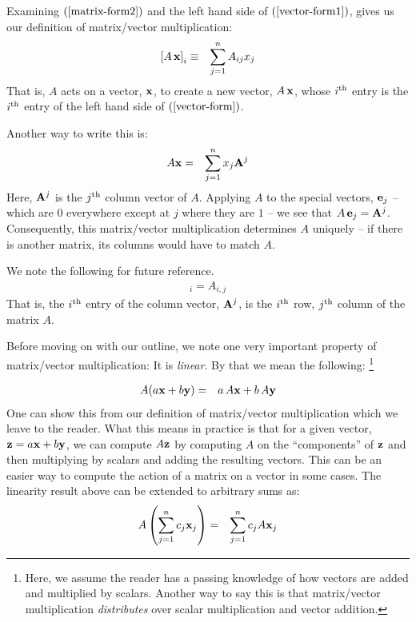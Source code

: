 \documentclass{article}
\begin{document}
Examining $(\ref{matrix-form2})$ and the left hand side of
$(\ref{vector-form1})$, gives us our definition of matrix/vector multiplication:
\begin{eqnarray}
  \left[A \, {\bf x}\right]_i & \equiv & \sum_{j=1}^n A_{ij} x_j
                                         \label{matrix-vector-mult}
\end{eqnarray}
That is, $A$ acts on a vector, ${\bf x}$, to create a new vector, $A \, {\bf x}$,
whose $i^{\rm th}$ entry is the $i^{\rm th}$ entry of
the left hand side of $(\ref{vector-form})$.

Another way to write this is:
\begin{eqnarray}
  A {\bf x} & = & \sum_{j=1}^n x_j {\bf A}^j
\end{eqnarray}
Here, ${\bf A}^j$ is the $j^{\rm th}$ column vector of $A$. Applying $A$ to the special
vectors, ${\bf e}_j$
-- which are $0$ everywhere except at $j$ where they are $1$ --
we see that $A \, {\bf e}_j = {\bf A}^j$. 
Consequently, this matrix/vector
multiplication determines $A$ uniquely
-- if there is another matrix, its columns would have to match $A$.

We note the following for future reference.
\begin{eqnarray}
	[{\bf A}^j]_i = A_{i, j} \label{vec-matrix-index}
\end{eqnarray}
That is, the $i^{\rm th}$ entry of the column vector, ${\bf A}^j$, is the
$i^{\rm th}$ row,  $j^{\rm th}$ column of the matrix $A$. 

Before moving on with our outline, we note one very important property of 
matrix/vector multiplication: It is {\em linear\/}.
By that we mean the following:%
\footnote{Here, we assume the reader has a passing knowledge of how vectors 
are added and multiplied by scalars. Another way to say this is that matrix/vector
multiplication {\em distributes\/} over scalar multiplication and vector addition.}

\begin{eqnarray}
	A( a {\bf x} + b{\bf y} ) & = & a\, A{\bf x} + b\, A{\bf y}
\end{eqnarray}
One can show this from our definition of matrix/vector multiplication which we
leave to the reader. What this means in practice is that for a given vector, ${\bf z} = a{\bf x} + b{\bf y}$,
we can compute $A {\bf z}$ by computing $A$ on the ``components'' of ${\bf z}$ and then multiplying by scalars and adding
the resulting vectors.
This can be an easier way to compute the action of a matrix on a vector in some cases.
The linearity result above can be extended to arbitrary sums as:
\begin{eqnarray}
	A\left( \sum_{j=1}^n c_j {\bf x}_j \right) & = & \sum_{j=1}^n c_j A {\bf x}_j \label{linearity}
\end{eqnarray}
\end{document}
